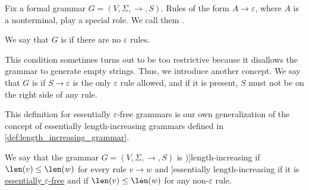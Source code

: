 \begin{definition}\label{def:epsilon_free_grammar}
  Fix a formal grammar \( G = (V, \Sigma, \to, S) \). Rules of the form \( A \to \varepsilon \), where \( A \) is a nonterminal, play a special role. We call them .

  We say that \( G \) is  if there are no \( \varepsilon \) rules.

  This condition sometimes turns out to be too restrictive because it disallows the grammar to generate empty strings. Thus, we introduce another concept. We say that \( G \) is  if \( S \to \varepsilon \) is the only \( \varepsilon \) rule allowed, and if it is present, \( S \) must not be on the right side of any rule.
\end{definition}
\begin{comments}
  \item This definition for essentially \( \varepsilon \)-free grammars is our own generalization of the concept of essentially length-increasing grammars defined in \cref{def:length_increasing_grammar}.
\end{comments}

\begin{definition}\label{def:length_increasing_grammar}
  We say that the grammar \( G = (V, \Sigma, \to, S) \) is \term[ru=неукорачивающая (грамматика) (\cite[83]{Гладкий1973ГрамматикиИЯзыки})]{length-increasing} if \( \len(v) \leq \len(w) \) for every rule \( v \to w \) and \term[ru=почти неукорачивающая (грамматика\cite[88]{Гладкий1973ГрамматикиИЯзыки}]{essentially length-increasing} if it is \hyperref[def:epsilon_free_grammar]{essentially \( \varepsilon \)-free} and if \( \len(v) \leq \len(w) \) for any non-\( \varepsilon \) rule.
\end{definition}

